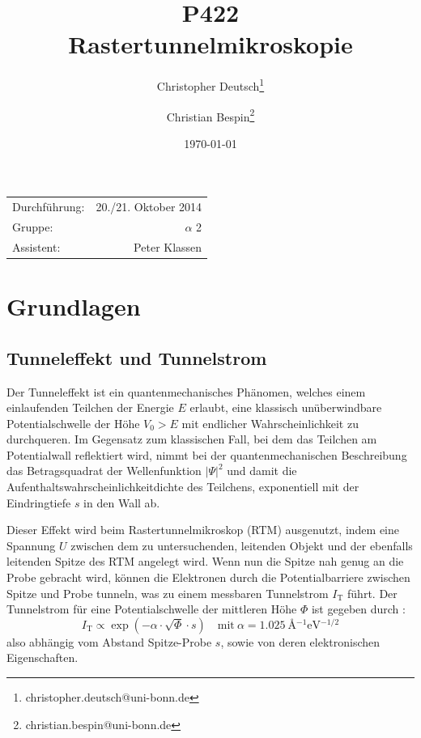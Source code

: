\documentclass[10pt, a4paper]{article}
\title{P422 \\ Rastertunnelmikroskopie}
\author{Christopher Deutsch\footnote{christopher.deutsch@uni-bonn.de} \and Christian Bespin\footnote{christian.bespin@uni-bonn.de}}
\date{\today}
\begin{document}
  
\maketitle

\begin{center}
\begin{tabular}{l r}
Durchführung: & 20./21. Oktober 2014 \\
Gruppe: &$\alpha$ 2 \\
Assistent: & Peter Klassen
\end{tabular}
\end{center}

\begin{abstract}
\end{abstract}

\tableofcontents
\newpage

\section{Grundlagen}

\subsection{Tunneleffekt und Tunnelstrom}
Der Tunneleffekt ist ein quantenmechanisches Phänomen, welches einem einlaufenden Teilchen der Energie $E$ erlaubt, eine klassisch unüberwindbare Potentialschwelle der Höhe $V_0 > E$ mit endlicher Wahrscheinlichkeit zu durchqueren.
Im Gegensatz zum klassischen Fall, bei dem das Teilchen am Potentialwall reflektiert wird, nimmt bei der quantenmechanischen Beschreibung das Betragsquadrat der Wellenfunktion $|\Psi|^2$ und damit die Aufenthaltswahrscheinlichkeitdichte des Teilchens, exponentiell mit der Eindringtiefe $s$ in den Wall ab.

Dieser Effekt wird beim Rastertunnelmikroskop (RTM) ausgenutzt, indem eine Spannung $U$ zwischen dem zu untersuchenden, leitenden Objekt und der ebenfalls leitenden Spitze des RTM angelegt wird.
Wenn nun die Spitze nah genug an die Probe gebracht wird, können die Elektronen durch die Potentialbarriere zwischen Spitze und Probe tunneln, was zu einem messbaren Tunnelstrom $I_\mathrm{T}$ führt.
Der Tunnelstrom für eine Potentialschwelle der mittleren Höhe $\Phi$ ist gegeben durch \cite{binning}:
\begin{equation}
  I_\mathrm{T} \propto \exp(-\alpha \cdot \sqrt{\Phi} \cdot s) \quad \text{mit}\: \alpha = \SI{1,025}{\angstrom^{-1}\electronvolt^{-1/2}}
  \label{eq:tunnelstrom}
\end{equation}
also abhängig vom Abstand Spitze-Probe $s$, sowie von deren elektronischen Eigenschaften.
\end{document}
